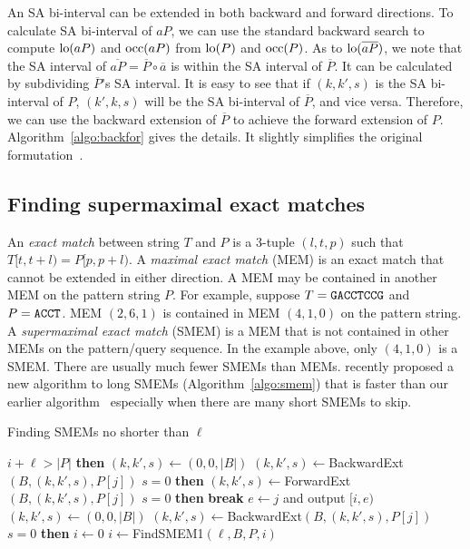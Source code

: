 \documentclass[webpdf,contemporary,large,namedate]{oup-authoring-template}%
\begin{document}
An SA bi-interval can be extended in both backward and forward directions.
To calculate SA bi-interval of $aP$, we can use the standard backward search to compute ${\rm lo}(aP)$ and ${\rm occ}(aP)$ from ${\rm lo}(P)$ and ${\rm occ}(P)$.
As to ${\rm lo}(\overline{aP})$, we note that the SA interval of $\overline{aP}=\overline{P}\circ\overline{a}$ is within the SA interval of $\overline{P}$.
It can be calculated by subdividing $\overline{P}$'s SA interval.
It is easy to see that if $(k,k',s)$ is the SA bi-interval of $P$, $(k',k,s)$ will be the SA bi-interval of $\overline{P}$, and vice versa.
Therefore, we can use the backward extension of $\overline{P}$ to achieve the forward extension of $P$.
Algorithm~\ref{algo:backfor} gives the details.
It slightly simplifies the original formutation~\citep{Li:2012fk}.

\subsection{Finding supermaximal exact matches}

An \emph{exact match} between string $T$ and $P$ is a 3-tuple $(l,t,p)$ such that $T[t,t+l)=P[p,p+l)$.
A \emph{maximal exact match} (MEM) is an exact match that cannot be extended in either direction.
A MEM may be contained in another MEM on the pattern string $P$.
For example, suppose $T={\tt GACCTCCG}$ and $P={\tt ACCT}$.
MEM $(2,6,1)$ is contained in MEM $(4,1,0)$ on the pattern string.
A \emph{supermaximal exact match} (SMEM) is a MEM that is not contained in other MEMs on the pattern/query sequence.
In the example above, only $(4,1,0)$ is a SMEM.
There are usually much fewer SMEMs than MEMs.
\citet{DBLP:conf/dlt/Gagie24} recently proposed a new algorithm to long SMEMs (Algorithm~\ref{algo:smem})
that is faster than our earlier algorithm~\citep{Li:2012fk}
especially when there are many short SMEMs to skip.

\begin{algorithm}
	\caption{Finding SMEMs no shorter than $\ell$~\citep{DBLP:conf/dlt/Gagie24}}\label{algo:smem}
	\begin{algorithmic}[1]
			 $i+\ell>|P|$ {\bf then} 
			\State $(k,k',s)\gets(0,0,|B|)$
				\State $(k,k',s)\gets${\sc BackwardExt}$(B,(k,k',s),P[j])$
				 $s=0$ {\bf then} 
			\EndFor
				\State $(k,k',s)\gets${\sc ForwardExt}$(B,(k,k',s),P[j])$
				 $s=0$ {\bf then} {\bf break}
			\EndFor
			\State $e\gets j$ and output $[i,e)$
			\State $(k,k',s)\gets(0,0,|B|)$
				\State $(k,k',s)\gets${\sc BackwardExt}$(B,(k,k',s),P[j])$
				 $s=0$ {\bf then} 
			\EndFor
		\EndProcedure
			\State $i\gets0$
			\Repeat
			\State $i\gets${\sc FindSMEM1}$(\ell,B,P,i)$
		\EndProcedure
	\end{algorithmic}
\end{algorithm}
\end{document}
